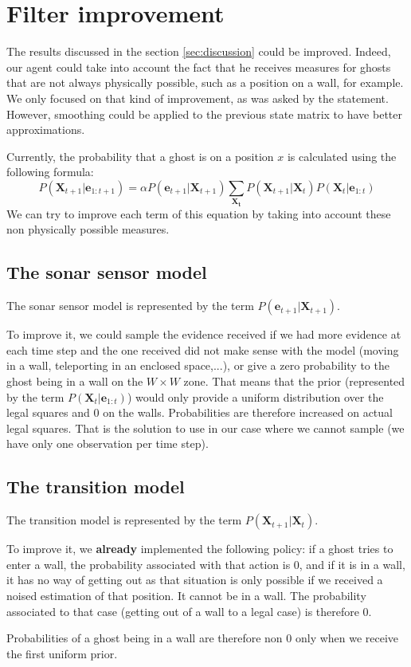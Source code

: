\documentclass[a4paper, 12pt]{article}
\begin{document}
    
    \section{Filter improvement}
    The results discussed in the section \ref{sec:discussion} could be improved. Indeed, our agent could take into account the fact that he receives measures for ghosts that are not always physically possible, such as a position on a wall, for example. We only focused on that kind of improvement, as was asked by the statement. However, smoothing could be applied to the previous state matrix to have better approximations.\par
    Currently, the probability that a ghost is on a position \(x\) is calculated using the following formula:
    \begin{equation}
        P\left (\bm{X}_{t+1}|\bm{e}_{1:t+1}\right ) = \alpha P\left (\bm{e}_{t+1}|\bm{X}_{t+1}\right )\sum_{\bm{X_t}}P\left (\bm{X}_{t+1}|\bm{X}_{t}\right )P\left (\bm{X}_{t}|\bm{e}_{1:t}\right )
    \end{equation}
    We can try to improve each term of this equation by taking into account these non physically possible measures.
    
    \subsection{The sonar sensor model}
    The sonar sensor model is represented by the term \(P\left (\bm{e}_{t+1}|\bm{X}_{t+1}\right )\).\par
    To improve it, we could sample the evidence received if we had more evidence at each time step and the one received did not make sense with the model (moving in a wall, teleporting in an enclosed space,...), or give a zero probability to the ghost being in a wall on the \(W\times W\) zone. That means that the prior (represented by the term \(P\left (\bm{X}_{t}|\bm{e}_{1:t}\right )\)) would only provide a uniform distribution over the legal squares and \num{0} on the walls. Probabilities are therefore increased on actual legal squares. That is the solution to use in our case where we cannot sample (we have only one observation per time step).
    
    \subsection{The transition model}
    The transition model is represented by the term \(P\left (\bm{X}_{t+1}|\bm{X}_{t}\right )\).\par
    To improve it, we \textbf{already} implemented the following policy: if a ghost tries to enter a wall, the probability associated with that action is \num{0}, and if it is in a wall, it has no way of getting out as that situation is only possible if we received a noised estimation of that position. It cannot be in a wall. The probability associated to that case (getting out of a wall to a legal case) is therefore \num{0}.\par
    Probabilities of a ghost being in a wall are therefore non \num{0} only when we receive the first uniform prior.
\end{document}
